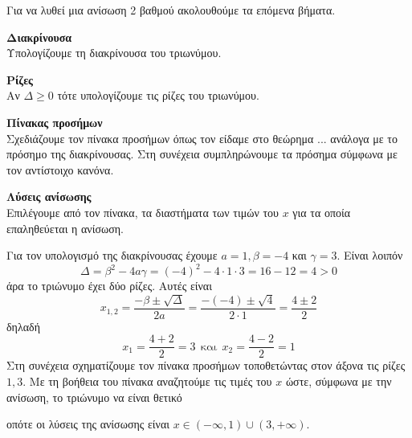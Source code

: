 \begin{Methodos}{9cm}
Για να λυθεί μια ανίσωση 2 βαθμού ακολουθούμε τα επόμενα βήματα.
\begin{bhma}
\item\textbf{Διακρίνουσα}\\
Υπολογίζουμε τη διακρίνουσα του τριωνύμου.
\item \textbf{Ρίζες}\\
Αν $ \varDelta\geq 0 $ τότε υπολογίζουμε τις ρίζες του τριωνύμου.
\item \textbf{Πίνακας προσήμων}\\
Σχεδιάζουμε τον πίνακα προσήμων όπως τον είδαμε στο θεώρημα ... ανάλογα με το πρόσημο της διακρίνουσας. Στη συνέχεια συμπληρώνουμε τα πρόσημα σύμφωνα με τον αντίστοιχο κανόνα.
\item\textbf{Λύσεις ανίσωσης}\\
Επιλέγουμε από τον πίνακα, τα διαστήματα των τιμών του $ x $ για τα οποία επαληθεύεται η ανίσωση.
\end{bhma}
\end{Methodos}
\lysh
\begin{alist}
\item Για τον υπολογισμό της διακρίνουσας έχουμε $ a=1,\beta=-4 $ και $ \gamma=3 $. Είναι λοιπόν
\[ \varDelta=\beta^2-4a\gamma=(-4)^2-4\cdot1\cdot3=16-12=4>0 \]
άρα το τριώνυμο έχει δύο ρίζες. Αυτές είναι
\[ x_{1,2}=\frac{-\beta\pm\sqrt{\varDelta}}{2a}=\frac{-(-4)\pm\sqrt{4}}{2\cdot 1}=\frac{4\pm 2}{2} \]
δηλαδή \[ x_1=\frac{4+2}{2}=3\ \ \textrm{και}\ \ x_2=\frac{4-2}{2}=1 \]
Στη συνέχεια σχηματίζουμε τον πίνακα προσήμων τοποθετώντας στον άξονα τις ρίζες $ 1,3 $. Με τη βοήθεια του πίνακα αναζητούμε τις τιμές του $ x $ ώστε, σύμφωνα με την ανίσωση, το τριώνυμο να είναι θετικό
\begin{center}
\end{center}
οπότε οι λύσεις της ανίσωσης είναι $ x\in(-\infty,1)\cup(3,+\infty) $.
\end{alist}
